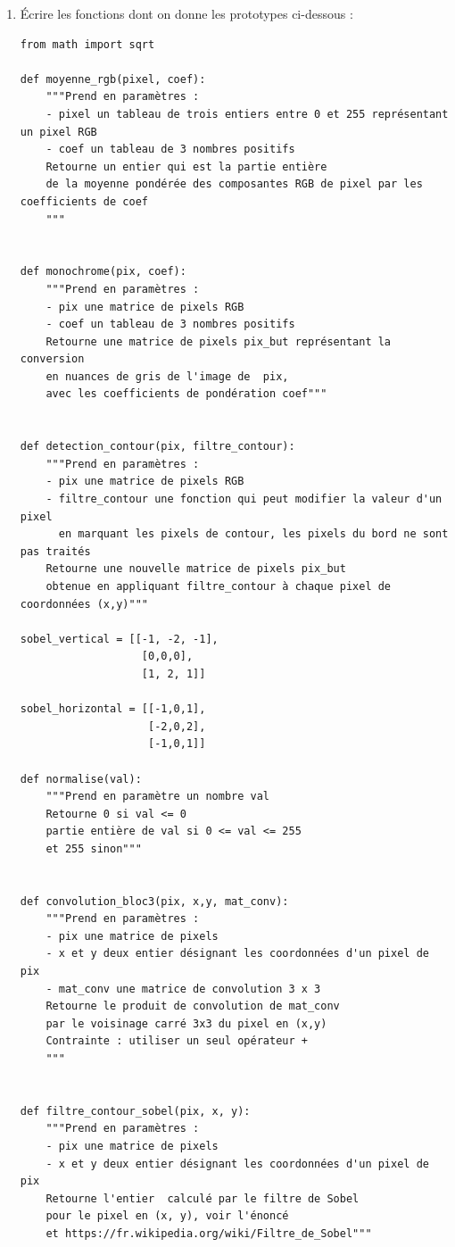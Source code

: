 \documentclass[a4paper, french, 12pt]{article}  %
\newcounter{def}
\begin{document}
\begin{enumerate}
	\item Écrire les fonctions dont on donne les prototypes ci-dessous :
\begin{lstlisting}[style=rond]
from math import sqrt

def moyenne_rgb(pixel, coef):
	"""Prend en paramètres :
	- pixel un tableau de trois entiers entre 0 et 255 représentant un pixel RGB
	- coef un tableau de 3 nombres positifs
	Retourne un entier qui est la partie entière
	de la moyenne pondérée des composantes RGB de pixel par les coefficients de coef
	"""
    

def monochrome(pix, coef):
    """Prend en paramètres :
    - pix une matrice de pixels RGB
    - coef un tableau de 3 nombres positifs
    Retourne une matrice de pixels pix_but représentant la conversion
    en nuances de gris de l'image de  pix,
    avec les coefficients de pondération coef"""
    

def detection_contour(pix, filtre_contour):
    """Prend en paramètres :
    - pix une matrice de pixels RGB
    - filtre_contour une fonction qui peut modifier la valeur d'un pixel 
      en marquant les pixels de contour, les pixels du bord ne sont pas traités
    Retourne une nouvelle matrice de pixels pix_but
    obtenue en appliquant filtre_contour à chaque pixel de coordonnées (x,y)""" 
    
sobel_vertical = [[-1, -2, -1],
                   [0,0,0],
                   [1, 2, 1]]

sobel_horizontal = [[-1,0,1],
                    [-2,0,2],
                    [-1,0,1]]
                    
def normalise(val):
    """Prend en paramètre un nombre val
    Retourne 0 si val <= 0
    partie entière de val si 0 <= val <= 255 
    et 255 sinon"""
    

def convolution_bloc3(pix, x,y, mat_conv): 
	"""Prend en paramètres :
	- pix une matrice de pixels
	- x et y deux entier désignant les coordonnées d'un pixel de pix
	- mat_conv une matrice de convolution 3 x 3
	Retourne le produit de convolution de mat_conv
	par le voisinage carré 3x3 du pixel en (x,y)
	Contrainte : utiliser un seul opérateur +
	"""
    

def filtre_contour_sobel(pix, x, y):  
    """Prend en paramètres :
	- pix une matrice de pixels
	- x et y deux entier désignant les coordonnées d'un pixel de pix
	Retourne l'entier  calculé par le filtre de Sobel
    pour le pixel en (x, y), voir l'énoncé
    et https://fr.wikipedia.org/wiki/Filtre_de_Sobel"""
\end{lstlisting}
\end{enumerate}
\end{document}
